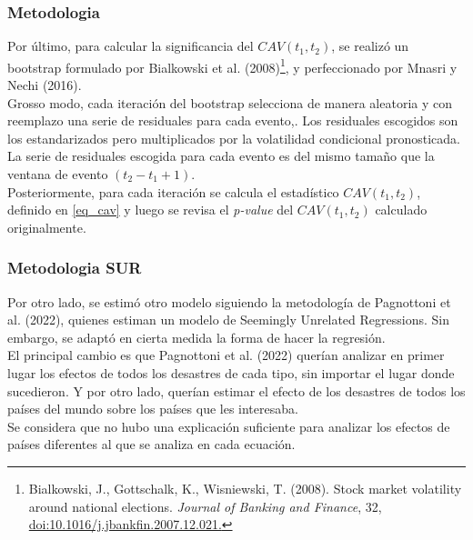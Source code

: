 \documentclass{beamer}
\begin{document}
\begin{frame}
\frametitle{Metodologia}
Por último, para calcular la significancia del $CAV(t_1,t_2)$, se realizó un bootstrap formulado por Bialkowski et al. (2008)\footnote{Bialkowski, J., Gottschalk, K., Wisniewski, T. (2008).
Stock market volatility around national elections.
\textit{Journal of Banking and Finance}, 32, \href{
https://doi.org/10.1016/j.jbankfin.2007.12.021
}{doi:10.1016/j.jbankfin.2007.12.021.}}, y perfeccionado por Mnasri y Nechi (2016).\\
Grosso modo, cada iteración del bootstrap selecciona de manera aleatoria y con reemplazo una serie de residuales para cada evento,. Los residuales escogidos son los estandarizados pero multiplicados por la volatilidad condicional pronosticada. La serie de residuales escogida para cada evento es del mismo tamaño que la ventana de evento $(t_2-t_1+1)$.\\
Posteriormente, para cada iteración se calcula el estadístico $CAV(t_1,t_2)$, definido en \eqref{eq_cav} y luego se revisa el \textit{p-value} del $CAV(t_1,t_2)$ calculado originalmente.
\end{frame}

\begin{frame}
\frametitle{Metodologia SUR}
Por otro lado, se estimó otro modelo siguiendo la metodología de Pagnottoni et al. (2022), quienes estiman un modelo de Seemingly Unrelated Regressions. Sin embargo, se adaptó en cierta medida la forma de hacer la regresión.\\
El principal cambio es que Pagnottoni et al. (2022) querían analizar en primer lugar los efectos de todos los desastres de cada tipo, sin importar el lugar donde sucedieron. Y por otro lado, querían estimar el efecto de los desastres de todos los países del mundo sobre los países que les interesaba.\\
Se considera que no hubo una explicación suficiente para analizar los efectos de países diferentes al que se analiza en cada ecuación.
\end{frame}
\end{document}
